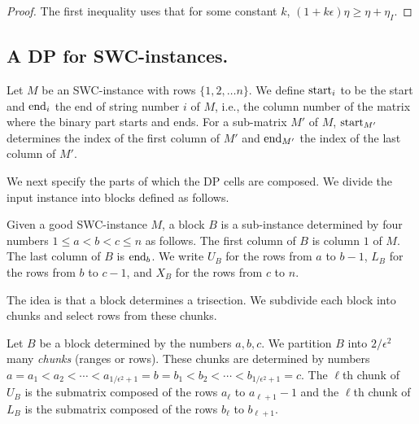 \begin{proof}
    The first inequality uses that for some constant $k$, $(1 + k \epsilon) \eta \ge \eta + \eta_I$.
\end{proof}

\subsection{A DP for SWC-instances.}%
\label{sec:second}

Let $M$ be an SWC-instance with rows  $\{1, 2, \ldots n\}$. 
We define $\textrm{start}_i$ to be the start and $\textrm{end}_i$ the end of string number $i$ of $M$, i.e., the column number of the matrix where the binary part starts and ends.
For a sub-matrix $M'$ of $M$, $\textrm{start}_{M'}$ determines the index of the first column of $M'$ and $\textrm{end}_{M'}$ the index of the last column of $M'$.

We next specify the parts of which the DP cells are composed.
We divide the input instance into blocks defined as follows.
\begin{definition}[Block]
    Given a good SWC-instance $M$, a block $B$ is a sub-instance determined by four numbers $1 \le a < b < c \le n$ as follows.
    The first column of $B$ is column $1$ of $M$. 
    The last column of $B$ is $\textrm{end}_{b}$.
    We write $U_B$ for the rows from $a$ to $b - 1$, $L_B$ for the rows from $b$ to $c - 1$, and $X_B$ for the rows from $c$ to $n$. 
    \label{def:sets-one-solution-string}
\end{definition}
The idea is that a block determines a trisection. 
We subdivide each block into chunks and select rows from these chunks. 
\begin{definition}[Chunk] 
    Let $B$ be a block determined by the numbers $a,b,c$.
    We partition $B$ into $2/\epsilon^2$ many \emph{chunks} (ranges or rows).
    These chunks are determined by numbers 
   $a = a_1 < a_{2} < \dotsm < a_{1/\epsilon^2 + 1} = b = b_{1} < b_{2} < \dotsm < b_{1/\epsilon^2 + 1} = c$. %
    The $\ell$th chunk of $U_B$ is the submatrix composed of the rows $a_{\ell}$ to $a_{\ell+1}-1$ and the $\ell$th chunk of $L_B$ is the submatrix composed of the rows $b_{\ell}$ to $b_{\ell+1}$.
    \label{def:subsets-one-solution-string}
\end{definition}

